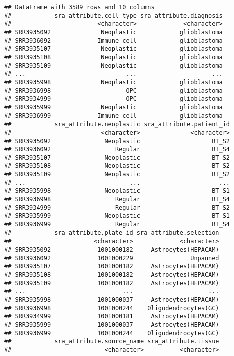 \documentclass[
]{article}
\begin{document}
\begin{verbatim}
## DataFrame with 3589 rows and 10 columns
##            sra_attribute.cell_type sra_attribute.diagnosis
##                        <character>             <character>
## SRR3935092              Neoplastic            glioblastoma
## SRR3936092             Immune cell            glioblastoma
## SRR3935107              Neoplastic            glioblastoma
## SRR3935108              Neoplastic            glioblastoma
## SRR3935109              Neoplastic            glioblastoma
## ...                            ...                     ...
## SRR3935998              Neoplastic            glioblastoma
## SRR3936998                     OPC            glioblastoma
## SRR3934999                     OPC            glioblastoma
## SRR3935999              Neoplastic            glioblastoma
## SRR3936999             Immune cell            glioblastoma
##            sra_attribute.neoplastic sra_attribute.patient_id
##                         <character>              <character>
## SRR3935092               Neoplastic                    BT_S2
## SRR3936092                  Regular                    BT_S4
## SRR3935107               Neoplastic                    BT_S2
## SRR3935108               Neoplastic                    BT_S2
## SRR3935109               Neoplastic                    BT_S2
## ...                             ...                      ...
## SRR3935998               Neoplastic                    BT_S1
## SRR3936998                  Regular                    BT_S4
## SRR3934999                  Regular                    BT_S2
## SRR3935999               Neoplastic                    BT_S1
## SRR3936999                  Regular                    BT_S4
##            sra_attribute.plate_id sra_attribute.selection
##                       <character>             <character>
## SRR3935092             1001000182     Astrocytes(HEPACAM)
## SRR3936092             1001000229                Unpanned
## SRR3935107             1001000182     Astrocytes(HEPACAM)
## SRR3935108             1001000182     Astrocytes(HEPACAM)
## SRR3935109             1001000182     Astrocytes(HEPACAM)
## ...                           ...                     ...
## SRR3935998             1001000037     Astrocytes(HEPACAM)
## SRR3936998             1001000244    Oligodendrocytes(GC)
## SRR3934999             1001000181     Astrocytes(HEPACAM)
## SRR3935999             1001000037     Astrocytes(HEPACAM)
## SRR3936999             1001000244    Oligodendrocytes(GC)
##            sra_attribute.source_name sra_attribute.tissue
##                          <character>          <character>

\end{verbatim}
\end{document}
